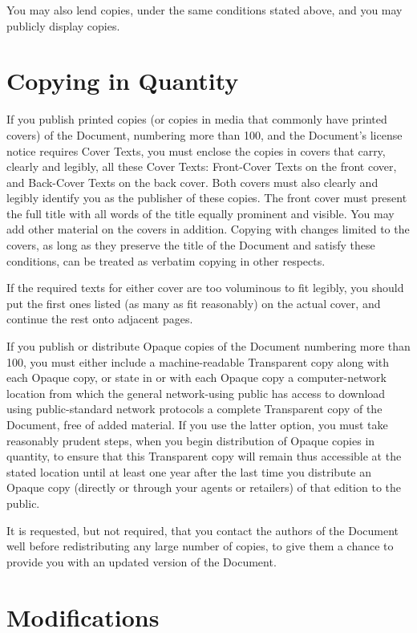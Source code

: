 You may also lend copies, under the same conditions stated above, and
you may publicly display copies.

\section{Copying in Quantity}

If you publish printed copies (or copies in media that commonly have
printed covers) of the Document, numbering more than 100, and the
Document's license notice requires Cover Texts, you must enclose the
copies in covers that carry, clearly and legibly, all these Cover
Texts: Front-Cover Texts on the front cover, and Back-Cover Texts on
the back cover.  Both covers must also clearly and legibly identify
you as the publisher of these copies.  The front cover must present
the full title with all words of the title equally prominent and
visible.  You may add other material on the covers in addition.
Copying with changes limited to the covers, as long as they preserve
the title of the Document and satisfy these conditions, can be treated
as verbatim copying in other respects.

If the required texts for either cover are too voluminous to fit
legibly, you should put the first ones listed (as many as fit
reasonably) on the actual cover, and continue the rest onto adjacent
pages.

If you publish or distribute Opaque copies of the Document numbering
more than 100, you must either include a machine-readable Transparent
copy along with each Opaque copy, or state in or with each Opaque copy
a computer-network location from which the general network-using
public has access to download using public-standard network protocols
a complete Transparent copy of the Document, free of added material.
If you use the latter option, you must take reasonably prudent steps,
when you begin distribution of Opaque copies in quantity, to ensure
that this Transparent copy will remain thus accessible at the stated
location until at least one year after the last time you distribute an
Opaque copy (directly or through your agents or retailers) of that
edition to the public.

It is requested, but not required, that you contact the authors of the
Document well before redistributing any large number of copies, to give
them a chance to provide you with an updated version of the Document.


\section{Modifications}

